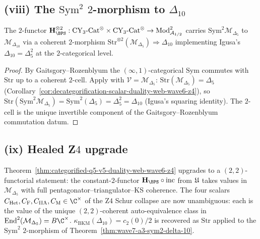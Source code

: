 \subsection*{(viii) The $\mathrm{Sym}^2$ $2$-morphism to $\Delta_{10}$}

\begin{theorem}
\label{thm:wave7-a3-sym2-delta-10}
\ClaimStatusTheorem
The $2$-functor
$\mathbf{H}_{\BPS}^{\otimes 2} : \mathrm{CY}_3\text{-}\mathrm{Cat}^{\otimes}
\times \mathrm{CY}_3\text{-}\mathrm{Cat}^{\otimes}
\to \mathrm{Mod}^{\mathrm{2}}_{\mathcal{A}_{1/2}}$
carries $\mathrm{Sym}^2 \mathcal{M}_{\Delta_5}$ to
$\mathcal{M}_{\Delta_{10}}$ via a coherent $2$-morphism
$\mathrm{Str}^{\otimes 2}(\mathcal{M}_{\Delta_5}) \Rightarrow \Delta_{10}$
implementing Igusa's $\Delta_{10} = \Delta_5^2$ at the
$2$-categorical level.
\end{theorem}

\begin{proof}
By Gaitsgory--Rozenblyum \cite{GaitsgoryRozenblyum2017V2} the
$(\infty,1)$-categorical $\mathrm{Sym}$ commutes with
$\mathrm{Str}$ up to a coherent $2$-cell. Apply with
$\mathcal{V} = \mathcal{M}_{\Delta_5}$: $\mathrm{Str}(\mathcal{M}_{\Delta_5}) = \Delta_5$
(Corollary~\ref{cor:decategorification-scalar-duality-web-wave6-z4}),
so $\mathrm{Str}(\mathrm{Sym}^2 \mathcal{M}_{\Delta_5}) =
\mathrm{Sym}^2(\Delta_5) = \Delta_5^2 = \Delta_{10}$
(Igusa's squaring identity). The $2$-cell is the unique invertible
component of the Gaitsgory--Rozenblyum commutation datum.
\end{proof}

\subsection*{(ix) Healed Z$4$ upgrade}

\begin{corollary}
\label{cor:wave7-a3-z4-upgraded}
\ClaimStatusTheorem
Theorem~\ref{thm:categorified-q5-v5-duality-web-wave6-z4} upgrades
to a $(2,2)$-functorial statement: the constant-$2$-functor
$\mathbf{H}_{\BPS} \circ \mathrm{inc}$ from $\mathfrak{U}$ takes values in
$\mathcal{M}_{\Delta_5}$ with full pentagonator--triangulator--KS
coherence. The four scalars
$C_{\mathrm{Het}}, C_{\mathrm{F}}, C_{\mathrm{IIA}}, C_{\mathrm{M}}
\in \C^\times$ of the Z$4$ Schur collapse are now unambiguous:
each is the value of the unique $(2,2)$-coherent auto-equivalence
class in $\mathrm{End}^{\mathrm{2}}(\mathcal{M}_{\Delta_5}) = B\C^\times$.
$\kappa_{\mathrm{BKM}}(\Delta_{10}) = c_2(0)/2$ is recovered as
$\mathrm{Str}$ applied to the $\mathrm{Sym}^2$ $2$-morphism of
Theorem~\ref{thm:wave7-a3-sym2-delta-10}.
\end{corollary}

